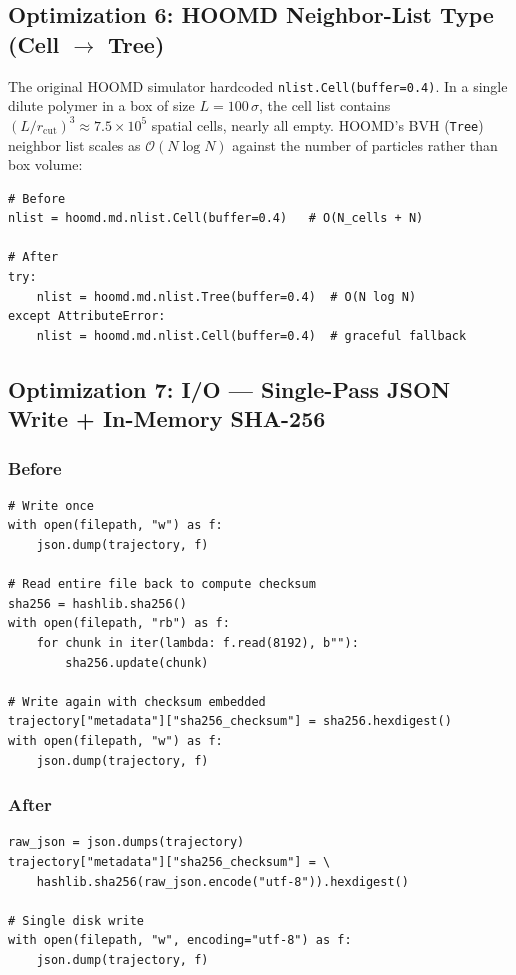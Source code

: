 \documentclass[12pt,a4paper]{article}
\newcommand{\Obig}[1]{\mathcal{O}\!\left(#1\right)}
\newcommand{\code}[1]{\texttt{#1}}
\begin{document}
\subsection{Optimization 6: HOOMD Neighbor-List Type (Cell $\to$ Tree)}
\label{sec:nlist-type}

The original HOOMD simulator hardcoded \code{nlist.Cell(buffer=0.4)}. In a
single dilute polymer in a box of size $L=100\,\sigma$, the cell list
contains $(L / r_\text{cut})^3 \approx 7.5\times10^5$ spatial cells, nearly
all empty. HOOMD's BVH (\code{Tree}) neighbor list scales as $\Obig{N\log N}$
against the number of particles rather than box volume:

\begin{lstlisting}[caption={Neighbour list type fix in \code{hoomd\_simulator.py}.}]
# Before
nlist = hoomd.md.nlist.Cell(buffer=0.4)   # O(N_cells + N)

# After
try:
    nlist = hoomd.md.nlist.Tree(buffer=0.4)  # O(N log N)
except AttributeError:
    nlist = hoomd.md.nlist.Cell(buffer=0.4)  # graceful fallback
\end{lstlisting}

\subsection{Optimization 7: I/O --- Single-Pass JSON Write + In-Memory SHA-256}
\label{sec:io}

\subsubsection{Before}
\begin{lstlisting}[caption={Original double-write trajectory save.}]
# Write once
with open(filepath, "w") as f:
    json.dump(trajectory, f)

# Read entire file back to compute checksum
sha256 = hashlib.sha256()
with open(filepath, "rb") as f:
    for chunk in iter(lambda: f.read(8192), b""):
        sha256.update(chunk)

# Write again with checksum embedded
trajectory["metadata"]["sha256_checksum"] = sha256.hexdigest()
with open(filepath, "w") as f:
    json.dump(trajectory, f)
\end{lstlisting}

\subsubsection{After}
\begin{lstlisting}[caption={Optimised in-memory SHA-256 + single-write.}]
raw_json = json.dumps(trajectory)
trajectory["metadata"]["sha256_checksum"] = \
    hashlib.sha256(raw_json.encode("utf-8")).hexdigest()

# Single disk write
with open(filepath, "w", encoding="utf-8") as f:
    json.dump(trajectory, f)
\end{lstlisting}
\end{document}
